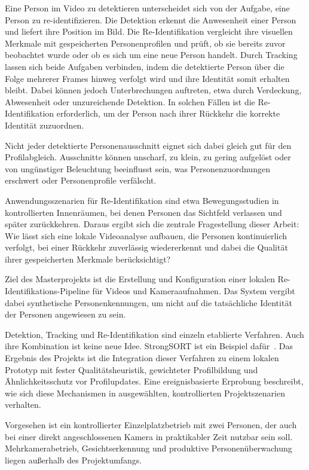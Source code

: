 \documentclass[runningheads,a4paper]{llncs}
\begin{document}
Eine Person im Video zu detektieren unterscheidet sich von der Aufgabe, eine Person zu re-identifizieren. Die Detektion erkennt die Anwesenheit einer Person und liefert ihre Position im Bild. Die Re-Identifikation vergleicht ihre visuellen Merkmale mit gespeicherten Personenprofilen und prüft, ob sie bereits zuvor beobachtet wurde oder ob es sich um eine neue Person handelt. Durch Tracking lassen sich beide Aufgaben verbinden, indem die detektierte Person über die Folge mehrerer Frames hinweg verfolgt wird und ihre Identität somit erhalten bleibt. Dabei können jedoch Unterbrechungen auftreten, etwa durch Verdeckung, Abwesenheit oder unzureichende Detektion. In solchen Fällen ist die Re-Identifikation erforderlich, um der Person nach ihrer Rückkehr die korrekte Identität zuzuordnen.

Nicht jeder detektierte Personenausschnitt eignet sich dabei gleich gut für den Profilabgleich. Ausschnitte können unscharf, zu klein, zu gering aufgelöst oder von ungünstiger Beleuchtung beeinflusst sein, was Personenzuordnungen erschwert oder Personenprofile verfälscht.

Anwendungsszenarien für Re-Identifikation sind etwa Bewegungsstudien in kontrollierten Innenräumen, bei denen Personen das Sichtfeld verlassen und später zurückkehren. Daraus ergibt sich die zentrale Fragestellung dieser Arbeit:
Wie lässt sich eine lokale Videoanalyse aufbauen, die Personen kontinuierlich verfolgt, bei einer Rückkehr zuverlässig wiedererkennt und dabei die Qualität ihrer gespeicherten Merkmale berücksichtigt?

Ziel des Masterprojekts ist die Erstellung und Konfiguration einer lokalen Re-Identifikations-Pipeline für Videos und Kameraaufnahmen. Das System vergibt dabei synthetische Personenkennungen, um nicht auf die tatsächliche Identität der Personen angewiesen zu sein.

Detektion, Tracking und Re-Identifikation sind einzeln etablierte Verfahren. Auch ihre Kombination ist keine neue Idee. StrongSORT ist ein Beispiel dafür~\cite{du2023strongsort}.
Das Ergebnis des Projekts ist die Integration dieser Verfahren zu einem lokalen Prototyp mit fester Qualitätsheuristik, gewichteter Profilbildung und Ähnlichkeitsschutz vor Profilupdates. Eine ereignisbasierte Erprobung beschreibt, wie sich diese Mechanismen in ausgewählten, kontrollierten Projektszenarien verhalten.

Vorgesehen ist ein kontrollierter Einzelplatzbetrieb mit zwei Personen, der auch bei einer direkt angeschlossenen Kamera in praktikabler Zeit nutzbar sein soll. Mehrkamerabetrieb, Gesichtserkennung und produktive Personenüberwachung liegen au{\ss}erhalb des Projektumfangs.
\end{document}
